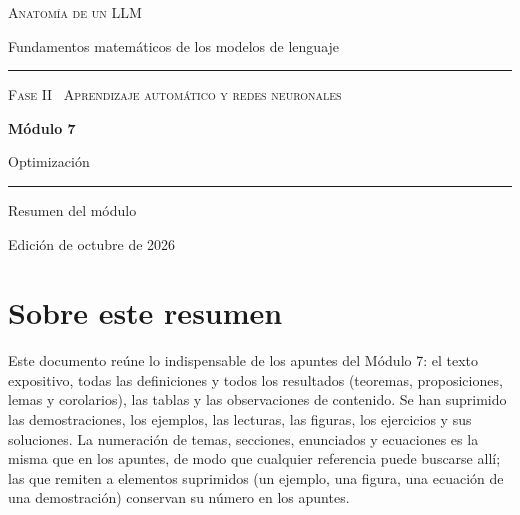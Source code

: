 \documentclass[11pt,a4paper,twoside,openany]{book}
\begin{document}
\frontmatter
\begin{titlepage}
\centering
\vspace*{2.5cm}
{\large\scshape Anatomía de un LLM}\par
\vspace{0.4cm}
{\normalsize Fundamentos matemáticos de los modelos de lenguaje}\par
\vspace{2.2cm}
\rule{\textwidth}{0.8pt}\par\vspace{0.5cm}
{\small\scshape Fase II \textperiodcentered\ Aprendizaje automático y redes neuronales}\par\vspace{0.3cm}
{\Huge\bfseries Módulo 7\par}\vspace{0.3cm}
{\LARGE Optimización\par}
\vspace{0.5cm}\rule{\textwidth}{0.4pt}\par
\vspace{1.6cm}
{\large Resumen del módulo}\par
\vfill
{\small Edición de octubre de 2026}\par
\end{titlepage}

\chapter*{Sobre este resumen}

Este documento reúne lo indispensable de los apuntes del Módulo 7: el texto expositivo, todas las definiciones y todos los resultados (teoremas, proposiciones, lemas y corolarios), las tablas y las observaciones de contenido. Se han suprimido las demostraciones, los ejemplos, las lecturas, las figuras, los ejercicios y sus soluciones. La numeración de temas, secciones, enunciados y ecuaciones es la misma que en los apuntes, de modo que cualquier referencia puede buscarse allí; las que remiten a elementos suprimidos (un ejemplo, una figura, una ecuación de una demostración) conservan su número en los apuntes.
\end{document}
